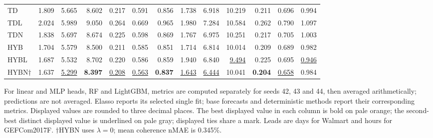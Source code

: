\begin{table}[!htbp]
\begin{tabular*}{\textwidth}{@{\extracolsep{\fill}}l*{12}{r}@{}}
TD & 1.809 & 5.665 & 8.602 & 0.217 & 0.591 & 0.856 & 1.738 & 6.918 & 10.219 & 0.211 & 0.696 & 0.994 \\
TDL & 2.024 & 5.989 & 9.050 & 0.264 & 0.669 & 0.965 & 1.980 & 7.284 & 10.584 & 0.262 & 0.790 & 1.097 \\
TDN & 1.838 & 5.697 & 8.674 & 0.225 & 0.598 & 0.869 & 1.767 & 6.975 & 10.251 & 0.217 & 0.705 & 1.003 \\
HYB & 1.704 & 5.579 & 8.500 & 0.211 & 0.585 & 0.851 & 1.714 & 6.814 & 10.014 & 0.209 & 0.689 & 0.982 \\
HYBL & 1.687 & 5.532 & 8.702 & 0.220 & 0.586 & 0.859 & 1.940 & 6.840 & \cellcolor{accuracysecond}\underline{9.494} & 0.225 & 0.695 & \cellcolor{accuracysecond}\underline{0.946} \\
HYBN$\dagger$ & 1.637 & \cellcolor{accuracysecond}\underline{5.299} & \cellcolor{accuracybest}\textbf{8.397} & \cellcolor{accuracysecond}\underline{0.208} & \cellcolor{accuracysecond}\underline{0.563} & \cellcolor{accuracybest}\textbf{0.837} & \cellcolor{accuracysecond}\underline{1.643} & \cellcolor{accuracysecond}\underline{6.444} & 10.041 & \cellcolor{accuracybest}\textbf{0.204} & \cellcolor{accuracysecond}\underline{0.658} & 0.984 \\
\bottomrule
\end{tabular*}
\par\smallskip\begin{minipage}{\textwidth}\footnotesize For linear and MLP heads, RF and LightGBM, metrics are computed separately for seeds 42, 43 and 44, then averaged arithmetically; predictions are not averaged. Elasso reports its selected single fit; base forecasts and deterministic methods report their corresponding metrics. Displayed values are rounded to three decimal places. The best displayed value in each column is bold on pale orange; the second-best distinct displayed value is underlined on pale gray; displayed ties share a mark. Leads are days for Walmart and hours for GEFCom2017F. $\dagger$HYBN uses $\lambda=0$; mean coherence nMAE is 0.345\%.\end{minipage}
\endgroup
\end{table}
